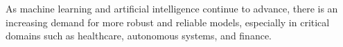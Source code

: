 As machine learning and artificial intelligence continue to advance, there is an increasing demand for more robust and reliable models, especially in critical domains such as healthcare, autonomous systems, and finance.